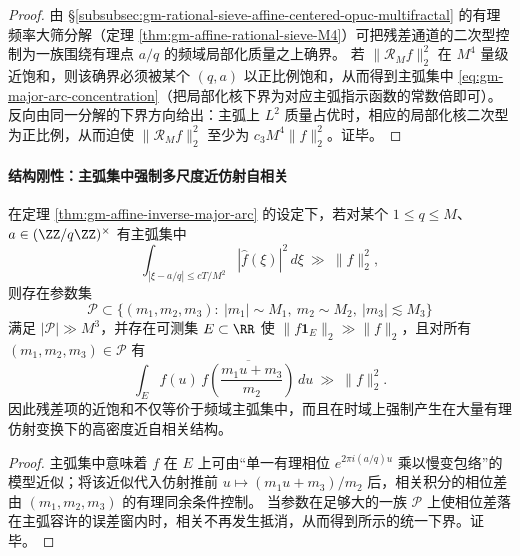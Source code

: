 \begin{proof}
由 \S\ref{subsubsec:gm-rational-sieve-affine-centered-opuc-multifractal} 的有理频率大筛分解（定理 \ref{thm:gm-affine-rational-sieve-M4}）可把残差通道的二次型控制为一族围绕有理点 \(a/q\) 的频域局部化质量之上确界。
若 \(\|\mathcal{R}_M f\|_2^2\) 在 \(M^4\) 量级近饱和，则该确界必须被某个 \((q,a)\) 以正比例饱和，从而得到主弧集中 \eqref{eq:gm-major-arc-concentration}（把局部化核下界为对应主弧指示函数的常数倍即可）。
反向由同一分解的下界方向给出：主弧上 \(L^2\) 质量占优时，相应的局部化核二次型为正比例，从而迫使 \(\|\mathcal{R}_M f\|_2^2\) 至少为 \(c_3M^4\|f\|_2^2\)。证毕。
\end{proof}

\paragraph{结构刚性：主弧集中强制多尺度近仿射自相关}
\begin{proposition}\label{prop:gm-major-arc-rigidity-affine-autocorr}
在定理 \ref{thm:gm-affine-inverse-major-arc} 的设定下，若对某个 \(1\le q\le M\)、\(a\in(\ZZ/q\ZZ)^\times\) 有主弧集中
\[
\int_{|\xi-a/q|\le cT/M^{2}} |\widehat f(\xi)|^2\,d\xi\ \gg\ \|f\|_2^2,
\]
则存在参数集
\[
\mathcal{P}\subset\{(m_1,m_2,m_3):\ |m_1|\sim M_1,\ m_2\sim M_2,\ |m_3|\lesssim M_3\}
\]
满足 \(|\mathcal{P}|\gg M^3\)，并存在可测集 \(E\subset\RR\) 使 \(\|f\mathbf{1}_E\|_2\gg \|f\|_2\)，且对所有 \((m_1,m_2,m_3)\in\mathcal{P}\) 有
\[
\int_E f(u)\,\overline{f\!\left(\frac{m_1u+m_3}{m_2}\right)}\,du\ \gg\ \|f\|_2^2.
\]
因此残差项的近饱和不仅等价于频域主弧集中，而且在时域上强制产生在大量有理仿射变换下的高密度近自相关结构。
\end{proposition}


\begin{proof}
主弧集中意味着 \(f\) 在 \(E\) 上可由“单一有理相位 \(e^{2\pi i(a/q)u}\) 乘以慢变包络”的模型近似；将该近似代入仿射推前 \(u\mapsto(m_1u+m_3)/m_2\) 后，相关积分的相位差由 \((m_1,m_2,m_3)\) 的有理同余条件控制。
当参数在足够大的一族 \(\mathcal{P}\) 上使相位差落在主弧容许的误差窗内时，相关不再发生抵消，从而得到所示的统一下界。证毕。
\end{proof}

